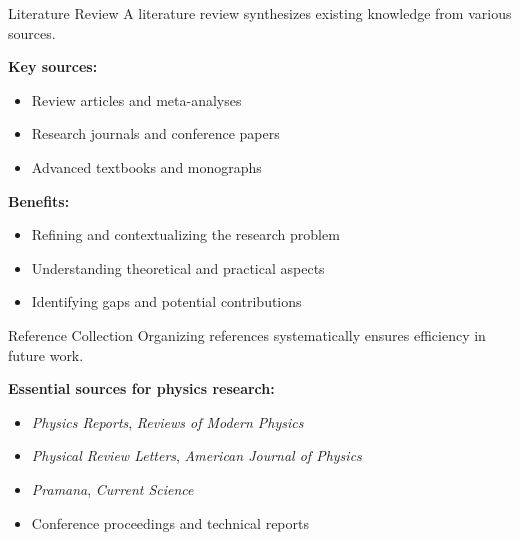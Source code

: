 \begin{frame}{Literature Review}
  A literature review synthesizes existing knowledge from various sources.

  \textbf{Key sources:}
  \begin{itemize}
    \item Review articles and meta-analyses
    \item Research journals and conference papers
    \item Advanced textbooks and monographs
  \end{itemize}

  \textbf{Benefits:}
  \begin{itemize}
    \item Refining and contextualizing the research problem
    \item Understanding theoretical and practical aspects
    \item Identifying gaps and potential contributions
  \end{itemize}
\end{frame}

\begin{frame}{Reference Collection}
  Organizing references systematically ensures efficiency in future work.

  \textbf{Essential sources for physics research:}
  \begin{itemize}
    \item \textit{Physics Reports}, \textit{Reviews of Modern Physics}
    \item \textit{Physical Review Letters}, \textit{American Journal of Physics}
    \item \textit{Pramana}, \textit{Current Science}
    \item Conference proceedings and technical reports
  \end{itemize}
\end{frame}

